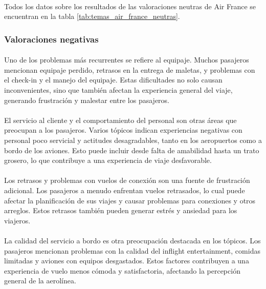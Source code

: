 \documentclass{report}
\begin{document}
{                    \paragraph*{}{
                        Todos los datos sobre los resultados de las valoraciones neutras de Air France se encuentran en la tabla \ref{tab:temas_air_france_neutras}.
                    }
                \subsubsection*{Valoraciones negativas}
                    \paragraph*{}{
                        Uno de los problemas más recurrentes se refiere al equipaje. Muchos pasajeros mencionan equipaje perdido, retrasos en la entrega de maletas, y problemas con el check-in y el manejo del equipaje. Estas dificultades no solo causan inconvenientes, sino que también afectan la experiencia general del viaje, generando frustración y malestar entre los pasajeros.
                    }
                    \paragraph*{}{
                        El servicio al cliente y el comportamiento del personal son otras áreas que preocupan a los pasajeros. Varios tópicos indican experiencias negativas con personal poco servicial y actitudes desagradables, tanto en los aeropuertos como a bordo de los aviones. Esto puede incluir desde falta de amabilidad hasta un trato grosero, lo que contribuye a una experiencia de viaje desfavorable.
                    }
                    \paragraph*{}{
                        Los retrasos y problemas con vuelos de conexión son una fuente de frustración adicional. Los pasajeros a menudo enfrentan vuelos retrasados, lo cual puede afectar la planificación de sus viajes y causar problemas para conexiones y otros arreglos. Estos retrasos también pueden generar estrés y ansiedad para los viajeros.
                    }
                    \paragraph*{}{
                        La calidad del servicio a bordo es otra preocupación destacada en los tópicos. Los pasajeros mencionan problemas con la calidad del inflight entertainment, comidas limitadas y aviones con equipos desgastados. Estos factores contribuyen a una experiencia de vuelo menos cómoda y satisfactoria, afectando la percepción general de la aerolínea.
                    }
}
\end{document}
